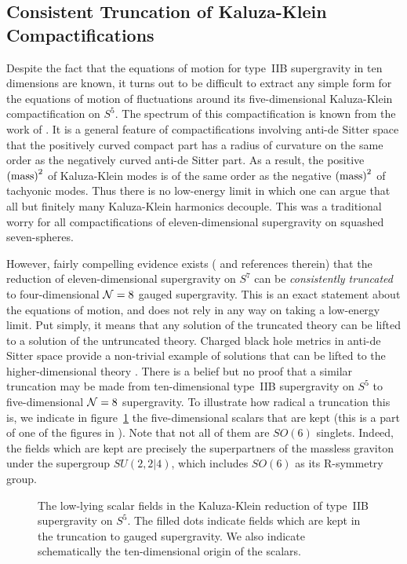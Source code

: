 \subsection{Consistent Truncation of Kaluza-Klein Compactifications}
\label{ConsistentTruncation}

Despite the fact that the equations of motion for type~IIB
supergravity in
ten dimensions are known, it turns out to be difficult to extract any
simple form for the equations of motion of fluctuations around
its five-dimensional Kaluza-Klein compactification on $S^5$.
The
spectrum of this compactification
is known from the work of \cite{Kim:1985ez,Gunaydin:1985fk}.
It
is a general feature of compactifications involving anti-de Sitter
space
that the positively curved compact part has a radius of curvature on
the
same order as the negatively curved anti-de Sitter part.  As a result,
the
positive $\hbox{(mass)}^2$ of Kaluza-Klein modes is of the same order
as
the negative $\hbox{(mass)}^2$ of tachyonic modes.  Thus there is no
low-energy limit in which one can argue that all but finitely many
Kaluza-Klein harmonics decouple.  This was a traditional worry for all
compactifications of eleven-dimensional supergravity on squashed
seven-spheres.

However, fairly compelling evidence exists (\cite{deWit:1987iy} and
references therein) 
that the reduction of eleven-dimensional supergravity on $S^7$ can be
{\it
consistently truncated} to four-dimensional ${\cal N}=8$ gauged
supergravity.  This is an exact statement about the equations of
motion,
and does not rely in any way on taking a low-energy limit.  Put
simply, it
means that any solution of the truncated theory can be lifted to a
solution
of the untruncated theory.  Charged black hole metrics in anti-de
Sitter
space provide a non-trivial example of solutions that can be lifted to
the
higher-dimensional theory
\cite{Chamblin:1999tk,Cvetic:1999ne,Cvetic:1999xp}.  There is a belief
but
no proof that a similar truncation may be made from ten-dimensional
type~IIB supergravity on $S^5$ to five-dimensional ${\cal N}=8$
supergravity.  To illustrate how radical a truncation this is, we
indicate
in figure~\ref{figCssg} the five-dimensional scalars that are kept
(this is
a part of one of the figures in \cite{Kim:1985ez}).  Note that not all
of
them are $SO(6)$ singlets.  Indeed, the fields which are kept are
precisely the
superpartners of the massless graviton under the supergroup
$SU(2,2|4)$,
which includes $SO(6)$ as its R-symmetry group.

\begin{figure}
      \vskip0cm
   \centerline{}
   \vskip0cm
 \caption{The low-lying scalar fields in the Kaluza-Klein reduction of
type~IIB supergravity on $S^5$.  The filled dots indicate fields which
are
kept in the truncation to gauged supergravity. We also indicate
schematically the ten-dimensional origin of the
scalars.}\label{figCssg}
  \end{figure}

